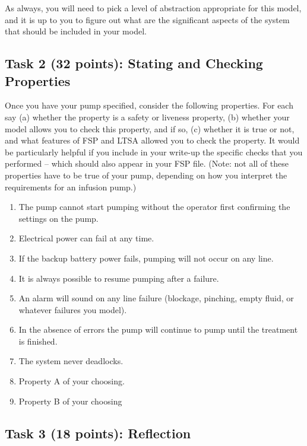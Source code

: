 \documentclass{article}
\newcommand{\head}{\subsection*}
\begin{document}
\bigskip

As always, you will need to pick a level of abstraction appropriate for this model, and it is up to
you to figure out what are the significant aspects of the system that should be included in your
model.

\head{Task 2 (32 points): Stating and Checking Properties}

Once you have your pump specified, consider the following properties. For each say (a) whether the property
is a safety or liveness property,  (b) whether your model allows you to check this property, and if
so, (c) whether it is true or not, and what features of FSP and LTSA allowed you to check the
property. It would be particularly helpful if you include in your write-up the specific checks that you performed -- which should also appear in your FSP file. (Note: not all of these properties have to be true of your pump, depending on how you interpret the requirements for an infusion pump.)

\begin{enumerate}
    \item The pump cannot start pumping without the operator first confirming the settings on the pump.
    \item Electrical power can fail at any time.
    \item If the backup battery power fails, pumping will not occur on any line.
    \item It is always possible to resume pumping after a failure.
    \item An alarm will sound on any line failure (blockage, pinching, empty fluid, or
whatever failures you model).
    \item In the absence of errors the pump will continue to pump until the
treatment is finished.
    \item The system never deadlocks.
    \item Property A of your choosing.
    \item Property B of your choosing
\end{enumerate}

\head{Task 3 (18 points): Reflection}
\end{document}
